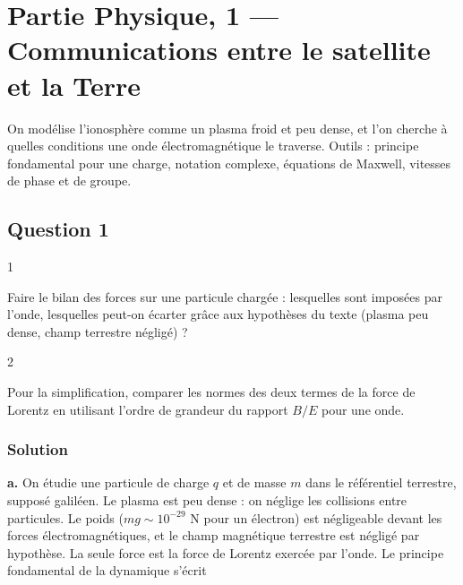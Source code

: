 \documentclass[11pt,a4paper]{article}
\newcommand{\equationajustee}[1]{%
  \sbox{\boiteequation}{$\displaystyle #1$}%
  \ifdim\wd\boiteequation>\linewidth
    \[\resizebox{\linewidth}{!}{\usebox{\boiteequation}}\]%
  \else
    \[#1\]%
  \fi}
\begin{document}
\hypertarget{partie-physique-1-communications-entre-le-satellite-et-la-terre}{%
\section{Partie Physique, 1 --- Communications entre le satellite et la Terre}\label{partie-physique-1-communications-entre-le-satellite-et-la-terre}}

On modélise l'ionosphère comme un plasma froid et peu dense, et l'on cherche à quelles conditions une onde électromagnétique le traverse. Outils : principe fondamental pour une charge, notation complexe, équations de Maxwell, vitesses de phase et de groupe.

\hypertarget{question-1}{%
\subsection{Question 1}\label{question-1}}

\begin{indication}{1}

Faire le bilan des forces sur une particule chargée : lesquelles sont imposées par l'onde, lesquelles peut-on écarter grâce aux hypothèses du texte (plasma peu dense, champ terrestre négligé) ?

\end{indication}

\begin{indication}{2}

Pour la simplification, comparer les normes des deux termes de la force de Lorentz en utilisant l'ordre de grandeur du rapport \(B/E\) pour une onde.

\end{indication}

\hypertarget{solution}{%
\subsubsection{Solution}\label{solution}}

\textbf{a.} On étudie une particule de charge \(q\) et de masse \(m\) dans le référentiel terrestre, supposé galiléen. Le plasma est peu dense : on néglige les collisions entre particules. Le poids (\(mg\sim10^{-29}\) N pour un électron) est négligeable devant les forces électromagnétiques, et le champ magnétique terrestre est négligé par hypothèse. La seule force est la force de Lorentz exercée par l'onde. Le principe fondamental de la dynamique s'écrit

\equationajustee{\boxed{m\,\frac{\mathrm d\vec v}{\mathrm dt}=q\left(\vec E(\vec r,t)+\vec v\wedge\vec B(\vec r,t)\right)}}
\end{document}
